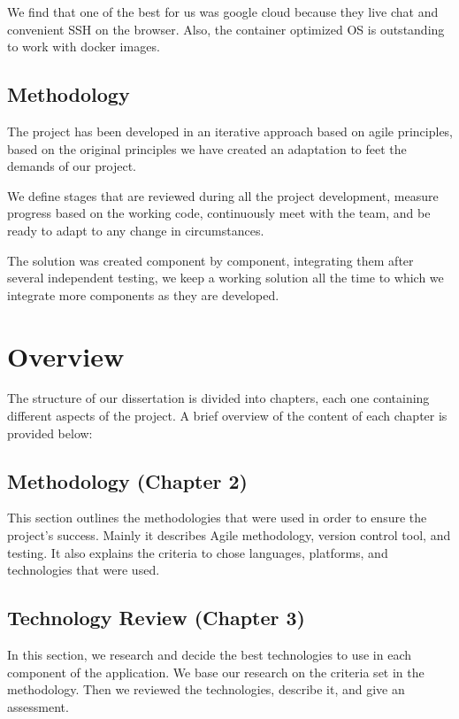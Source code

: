 We find that one of the best for us was google cloud because they live chat and convenient SSH on the browser.  Also, the container optimized OS is outstanding to work with docker images. 


\subsection{Methodology}
\vskip 0.1in
\indent
\indent
The project has been developed in an iterative approach based on agile principles, based on the original principles we have created an adaptation to feet the demands of our project.

We define stages that are reviewed during all the project development, measure progress based on the working code, continuously meet with the team, and be ready to adapt to any change in circumstances.

The solution was created component by component, integrating them after several independent testing, we keep a working solution all the time to which we integrate more components as they are developed.

\section{Overview}
\vskip 0.1in
\indent
\indent

The structure of our dissertation is divided into chapters, each one containing different aspects of the project. A brief overview of the content of each chapter is provided below:

\subsection{Methodology (Chapter 2)}
This section outlines the methodologies that were used in order to ensure the project's success.
Mainly it describes Agile methodology, version control tool, and testing.
It also explains the criteria to chose languages, platforms, and technologies that were used.


\subsection{Technology Review (Chapter 3)}

In this section, we research and decide the best technologies to use in each component of the application. We base our research on the criteria set in the methodology.  Then we reviewed the technologies, describe it, and give an assessment.

